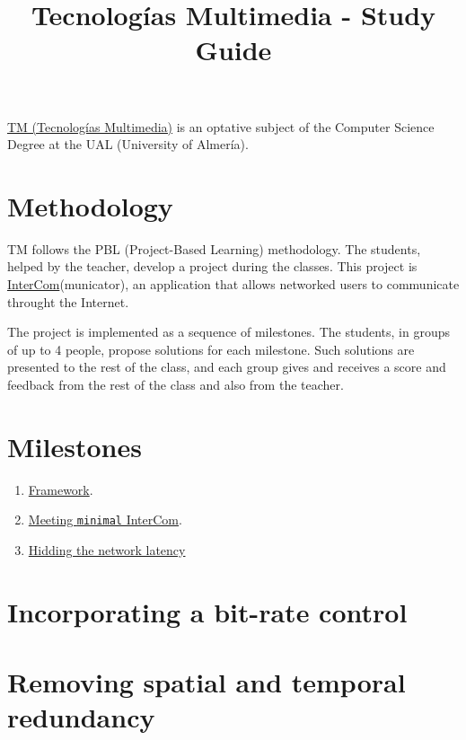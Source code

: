 \title{Tecnologías Multimedia - Study Guide}

\maketitle

\href{https://www.ual.es/estudios/grados/presentacion/plandeestudios/asignatura/4015/40154321}{TM
  (Tecnologías Multimedia)} is an optative subject of the Computer
Science Degree at the UAL (University of Almería).

\section{Methodology}
TM follows the PBL (Project-Based Learning) methodology. The students,
helped by the teacher, develop a project during the classes. This
project
is \href{https://github.com/Tecnologias-multimedia/intercom}{InterCom}(municator),
an application that allows networked users to communicate throught
the Internet.

The project is implemented as a sequence of milestones. The students,
in groups of up to 4 people, propose solutions for each
milestone. Such solutions are presented to the rest of the class, and
each group gives and receives a score and feedback from the rest of
the class and also from the teacher.

\section{Milestones}

\begin{enumerate}
\item \href{https://tecnologias-multimedia.github.io/study_guide/framework/}{Framework}.
\item \href{https://tecnologias-multimedia.github.io/study_guide/minimal/}{Meeting \texttt{minimal} InterCom}.
\item \href{https://tecnologias-multimedia.github.io/study_guide/latency/}{Hidding the network latency}
\end{enumerate}

\section{Incorporating a bit-rate control}

\section{Removing spatial and temporal redundancy}

